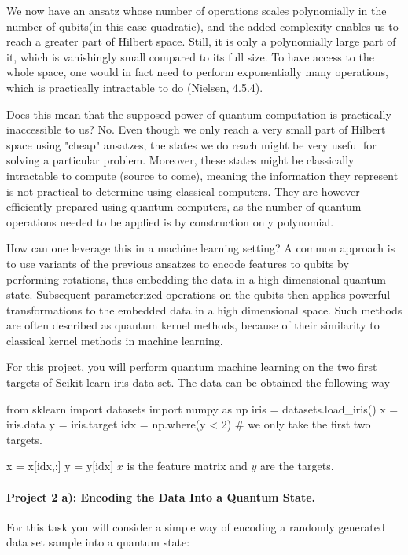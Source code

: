 \documentclass[%
oneside,                 %
final,                   %
10pt]{article}
\begin{document}
We now have an ansatz whose number of operations scales polynomially in the number of qubits(in this case quadratic), and the
added complexity enables us to reach a greater part of Hilbert space. Still, it is only a polynomially large part of it, which
is vanishingly small compared to its full size. To have access to the whole space, one would in fact need to perform exponentially
many operations, which is practically intractable to do (Nielsen, 4.5.4).

Does this mean that the supposed power of quantum computation is practically inaccessible to us? No. Even though we
only reach a very small part of Hilbert space using "cheap" ansatzes, the states we do reach might be very useful
for solving a particular problem. Moreover, these states might be classically intractable to compute (source to come),
meaning the information they represent is not practical to determine using classical computers. They are however efficiently
prepared using quantum computers, as the number of quantum operations needed to be applied is by construction only polynomial.

How can one leverage this in a machine learning setting? A common approach is to use variants of the previous ansatzes to encode features to qubits by performing rotations, thus embedding the data in a high dimensional quantum state. Subsequent parameterized operations on the qubits then applies powerful transformations to the embedded data in a high dimensional space. Such methods are often described as quantum kernel methods, because of their similarity to classical kernel methods in machine learning.

For this project, you will perform quantum machine learning on the two first targets of Scikit learn iris data set. The data can be obtained the following way

\bpycod
from sklearn import datasets
import numpy as np
iris = datasets.load_iris()
x = iris.data
y = iris.target
idx = np.where(y < 2) # we only take the first two targets.

x = x[idx,:]
y = y[idx]
\epycod
$x$ is the feature matrix and $y$ are the targets.

\paragraph{Project 2 a): Encoding the Data Into a Quantum State.}
For this task you will consider a simple way of encoding a randomly generated data set sample into a quantum state:
\end{document}
